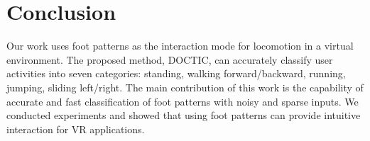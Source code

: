 \documentclass[review]{vgtc}                 %
\begin{document}






\section{Conclusion}
\label{sec:conclusion}
Our work uses foot patterns as the interaction mode for locomotion in a virtual environment. 
The proposed method, DOCTIC, can accurately classify user activities into seven categories: standing, walking forward/backward, running, jumping, sliding left/right. 
The main contribution of this work is the capability of accurate and fast classification of foot patterns with noisy and sparse inputs. 
We conducted experiments and showed that using foot patterns can provide intuitive interaction for VR applications. 
\end{document}
